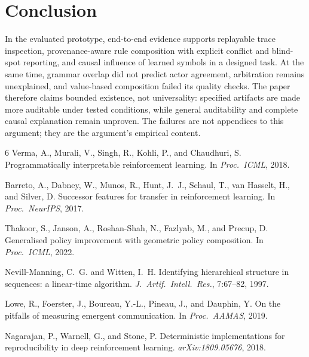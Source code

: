 \documentclass[11pt,a4paper]{article}
\theoremstyle{definition}
\begin{document}
\section{Conclusion}

In the evaluated prototype, end-to-end evidence supports replayable trace
inspection, provenance-aware rule composition with explicit conflict and
blind-spot reporting, and causal influence of learned symbols in a designed
task. At the same time, grammar overlap did not predict actor agreement,
arbitration remains unexplained, and value-based composition failed its
quality checks. The paper therefore claims bounded existence, not
universality: specified artifacts are made more auditable under tested
conditions, while general auditability and complete causal explanation remain
unproven. The failures are not appendices to this argument; they are the
argument's empirical content.

\begin{thebibliography}{6}
Verma, A., Murali, V., Singh, R., Kohli, P., and Chaudhuri, S.
\newblock Programmatically interpretable reinforcement learning.
\newblock In \emph{Proc.\ ICML}, 2018.

Barreto, A., Dabney, W., Munos, R., Hunt, J.~J., Schaul, T., van Hasselt, H.,
  and Silver, D.
\newblock Successor features for transfer in reinforcement learning.
\newblock In \emph{Proc.\ NeurIPS}, 2017.

Thakoor, S., Janson, A., Roshan-Shah, N., Fazlyab, M., and Precup, D.
\newblock Generalised policy improvement with geometric policy composition.
\newblock In \emph{Proc.\ ICML}, 2022.

Nevill-Manning, C.~G. and Witten, I.~H.
\newblock Identifying hierarchical structure in sequences: a linear-time
  algorithm.
\newblock \emph{J.\ Artif.\ Intell.\ Res.}, 7:67--82, 1997.

Lowe, R., Foerster, J., Boureau, Y.-L., Pineau, J., and Dauphin, Y.
\newblock On the pitfalls of measuring emergent communication.
\newblock In \emph{Proc.\ AAMAS}, 2019.

Nagarajan, P., Warnell, G., and Stone, P.
\newblock Deterministic implementations for reproducibility in deep
  reinforcement learning.
\newblock \emph{arXiv:1809.05676}, 2018.

\end{thebibliography}
\end{document}
